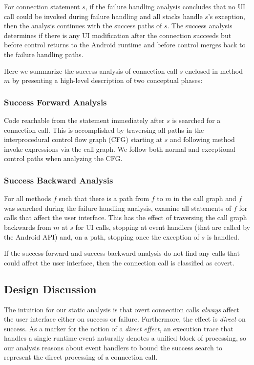 For connection statement $s$, if the failure handling analysis
concludes that no UI call could be invoked during failure
handling and all stacks handle $s$'s exception, then the analysis
continues with the success paths of $s$. The success analysis
determines if there is any UI modification after the
connection succeeds but before control returns to the Android runtime
and before control merges back to the failure handling paths.

Here we summarize the success analysis of connection call $s$ enclosed
in method $m$ by presenting a high-level description of two conceptual
phases:

\subsubsection{Success Forward Analysis} Code reachable from the
  statement immediately after $s$ is searched for a connection call.
  This is accomplished by traversing all paths in the interprocedural
  control flow graph (CFG) starting at $s$ and following method invoke
  expressions via the call graph.  We follow both normal and exceptional control paths
  when analyzing the CFG.  

\subsubsection{Success Backward Analysis} For all methods $f$ such
  that there is a path from $f$ to $m$ in the call graph and $f$ was
  searched during the failure handling analysis, examine all
  statements of $f$ for calls that affect the user interface.  This
  has the effect of traversing the call graph backwards from $m$ at
  $s$ for UI calls, stopping at event handlers (that are called by the
  Android API) and, on a path, stopping once the exception of $s$ is
  handled.

If the success forward and success backward analysis do not find any
calls that could affect the user interface, then the connection call
is classified as covert.

\subsection{Design Discussion}

The intuition for our static analysis is that overt connection
calls {\it always} affect the user interface either on success or
failure. Furthermore, the effect is {\it direct} on success.  As a
marker for the notion of a {\it direct effect}, an execution trace
that handles a single runtime event naturally denotes a unified block
of processing, so our analysis reasons about event handlers to bound
the success search to represent the direct processing of a connection
call.

